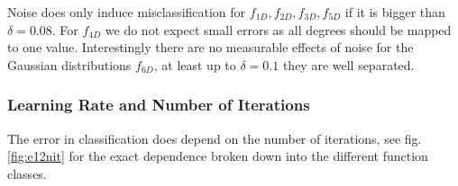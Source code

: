 \documentclass[useAMS,usenatbib]{mn2e}
\begin{document}
%
Noise does only induce misclassification for
$f_{1D},f_{2D},f_{3D},f_{5D}$ if it is bigger than $\delta=0.08$. For $f_{4D}$ we do not expect small errors as all degrees should be mapped to one value. Interestingly there are no measurable effects of noise for the Gaussian distributions $f_{6D}$, at least up to $\delta=0.1$ they are well separated.


\subsubsection{Learning Rate and Number of Iterations}

The error in classification does depend on the number of iterations, see fig. \ref{fig:e12nit} for the exact dependence broken down into the different function classes.
\end{document}
